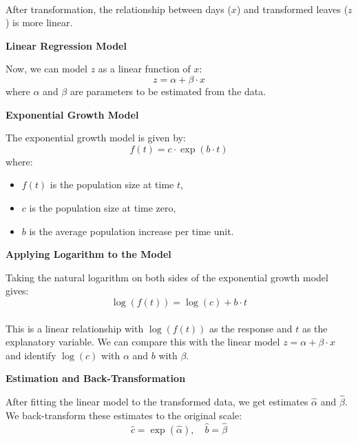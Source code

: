 \documentclass{article}
\begin{document}
\paragraph{}
After transformation, the relationship between days ($x$) and transformed leaves ($z$) is more linear. \hfill \break

\textbf{Linear Regression Model} \hfill \break

Now, we can model $z$ as a linear function of $x$:
\begin{equation}
z = \alpha + \beta \cdot x
\end{equation}
where $\alpha$ and $\beta$ are parameters to be estimated from the data. \hfill \break

\textbf{Exponential Growth Model} \hfill \break

The exponential growth model is given by:
\begin{equation}
f(t) = c \cdot \exp(b \cdot t)
\end{equation}
where:
\begin{itemize}
    \item $f(t)$ is the population size at time $t$,
    \item $c$ is the population size at time zero,
    \item $b$ is the average population increase per time unit.
\end{itemize} \hfill \break

\textbf{Applying Logarithm to the Model} \hfill \break

Taking the natural logarithm on both sides of the exponential growth model gives:
\begin{equation}
\log(f(t)) = \log(c) + b \cdot t
\end{equation}
\paragraph{}
This is a linear relationship with $\log(f(t))$ as the response and $t$ as the explanatory variable. We can compare this with the linear model $z = \alpha + \beta \cdot x$ and identify $\log(c)$ with $\alpha$ and $b$ with $\beta$. \hfill \break

\textbf{Estimation and Back-Transformation} \hfill \break

After fitting the linear model to the transformed data, we get estimates $\hat{\alpha}$ and $\hat{\beta}$. We back-transform these estimates to the original scale:
\begin{equation}
\hat{c} = \exp(\hat{\alpha}), \quad \hat{b} = \hat{\beta}
\end{equation}
\end{document}
